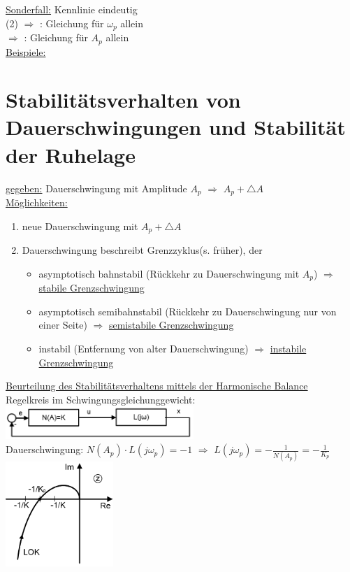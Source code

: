\documentclass[openany,a4paper,11pt]{book}
\begin{document}
\uline{Sonderfall:} Kennlinie eindeutig\\
(2) $\Rightarrow$ : Gleichung für $\omega_p$ allein\\
$\Rightarrow$ : Gleichung für $A_p$ allein\\
\uline{Beispiele:} 
\section[Stabilitätsverhalten]{Stabilitätsverhalten von Dauerschwingungen und Stabilität der Ruhelage}
\uline{gegeben:} Dauerschwingung mit Amplitude $A_p$ $\Rightarrow$ $A_p+\triangle A$\\
\uline{Möglichkeiten:}
\begin{enumerate}
    \item neue Dauerschwingung mit $A_p+\triangle A$
    \item{Dauerschwingung beschreibt Grenzzyklus(s. früher), der
    \begin{itemize}
        \item asymptotisch bahnstabil (Rückkehr zu Dauerschwingung mit $A_p$) $\Rightarrow$ \uline{stabile Grenzschwingung}
        \item asymptotisch semibahnstabil (Rückkehr zu Dauerschwingung nur von einer Seite) $\Rightarrow$ \uline{semistabile Grenzschwingung}
        \item instabil (Entfernung von alter Dauerschwingung) $\Rightarrow$ \uline{instabile Grenzschwingung}
    \end{itemize}}
\end{enumerate}
\uline{Beurteilung des Stabilitätsverhaltens mittels der Harmonische Balance}\\
Regelkreis im Schwingungsgleichunggewicht:\\
\includegraphics[width=2.8in]{imgs/NLR58.png}\\
Dauerschwingung: $N(A_p)\cdot L(j\omega_p)=-1$ $\Rightarrow$ $L(j\omega_p)=-\frac{1}{N(A_p)}=-\frac{1}{K_p}$\\
\includegraphics[width=1.6in]{imgs/NLR59.png}\\
\end{document}
